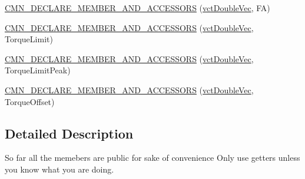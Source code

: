 {\bf }\par
\begin{DoxyCompactItemize}
\item 
\hyperlink{classprm_actuator_parameters_a7bb786869beec5b6b3b83619f3e3a4ff}{C\+M\+N\+\_\+\+D\+E\+C\+L\+A\+R\+E\+\_\+\+M\+E\+M\+B\+E\+R\+\_\+\+A\+N\+D\+\_\+\+A\+C\+C\+E\+S\+S\+O\+R\+S} (\hyperlink{vct_dynamic_vector_types_8h_ade4b3068c86fb88f41af2e5187e491c2}{vct\+Double\+Vec}, F\+A)
\end{DoxyCompactItemize}

{\bf }\par
\begin{DoxyCompactItemize}
\item 
\hyperlink{classprm_actuator_parameters_a81bd7bf30abc021dde0d2fbe0a6bf8cf}{C\+M\+N\+\_\+\+D\+E\+C\+L\+A\+R\+E\+\_\+\+M\+E\+M\+B\+E\+R\+\_\+\+A\+N\+D\+\_\+\+A\+C\+C\+E\+S\+S\+O\+R\+S} (\hyperlink{vct_dynamic_vector_types_8h_ade4b3068c86fb88f41af2e5187e491c2}{vct\+Double\+Vec}, Torque\+Limit)
\end{DoxyCompactItemize}

{\bf }\par
\begin{DoxyCompactItemize}
\item 
\hyperlink{classprm_actuator_parameters_a0c23510cef8dac14bebddd27e406e7bb}{C\+M\+N\+\_\+\+D\+E\+C\+L\+A\+R\+E\+\_\+\+M\+E\+M\+B\+E\+R\+\_\+\+A\+N\+D\+\_\+\+A\+C\+C\+E\+S\+S\+O\+R\+S} (\hyperlink{vct_dynamic_vector_types_8h_ade4b3068c86fb88f41af2e5187e491c2}{vct\+Double\+Vec}, Torque\+Limit\+Peak)
\end{DoxyCompactItemize}

{\bf }\par
\begin{DoxyCompactItemize}
\item 
\hyperlink{classprm_actuator_parameters_a1f6aafadb4aee573c63961711d51d9a8}{C\+M\+N\+\_\+\+D\+E\+C\+L\+A\+R\+E\+\_\+\+M\+E\+M\+B\+E\+R\+\_\+\+A\+N\+D\+\_\+\+A\+C\+C\+E\+S\+S\+O\+R\+S} (\hyperlink{vct_dynamic_vector_types_8h_ade4b3068c86fb88f41af2e5187e491c2}{vct\+Double\+Vec}, Torque\+Offset)
\end{DoxyCompactItemize}



\subsection{Detailed Description}
So far all the memebers are public for sake of convenience Only use getters unless you know what you are doing.

